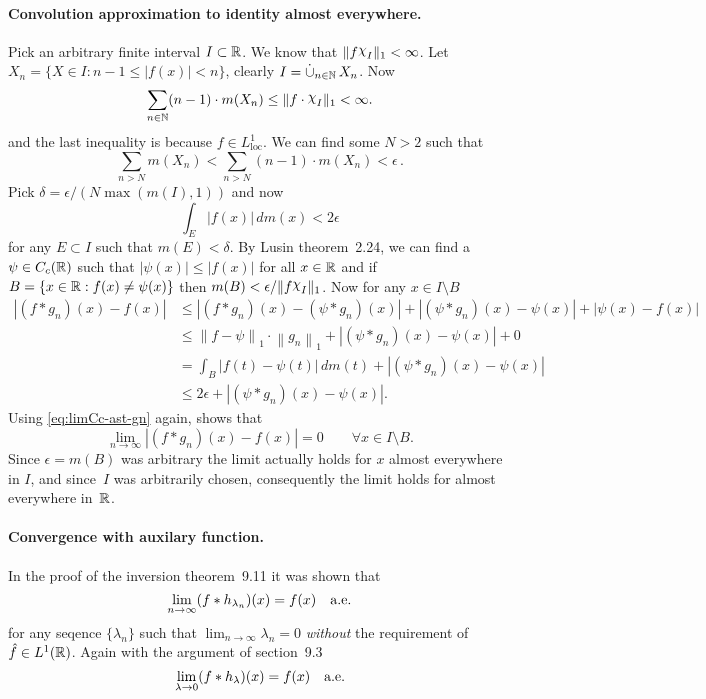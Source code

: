 \begin{enumerate}
\paragraph{Convolution approximation to identity almost everywhere.}
Pick an arbitrary finite interval \(I\subset \mathbb{R}\).
We know that \(\|f\chhi_I\|_1 < \infty\).
Let \(X_n = \{X\in I: n - 1 \leq |f(x)| < n\}\), 
clearly \(I=\disjunion_{n\in\N} X_n\).
Now
\begin{equation*}
\sum_{n\in\N} (n-1)\cdot m(X_n) 
 \leq \|f\cdot\chhi_I\|_1
 < \infty.
\end{equation*}
and the last inequality is because \(f\in L_{\textrm{loc}}^1\).
We can find some \(N>2\) such that  
\begin{equation*}
\sum_{n>N} m(X_n) < \sum_{n>N} (n-1)\cdot m(X_n) < \epsilon\,.
\end{equation*}
Pick \(\delta = \epsilon/(N \max(m(I),1))\) and now 
\begin{equation*}
\int_E |f(x)|\,dm(x) < 2\epsilon
\end{equation*}
for any \(E\subset I\) such that \(m(E) < \delta\).
By Lusin theorem~2.24, we can find a \(\psi\in C_c(\mathbb{R})\)
such that  \(|\psi(x)|\leq |f(x)|\) for all \(x\in\mathbb{R}\)
and if \(B = \{x\in\mathbb{R}: f(x)\neq \psi(x)\}\)
then \(m(B) < \epsilon / \|f\chhi_I\|_1\). Now for any \(x\in I \setminus B\)
\begin{align*}
|(f\ast g_n)(x) - f(x)|
&\leq  |(f \ast g_n)(x) - (\psi \ast g_n)(x)|
     + |(\psi \ast g_n)(x) - \psi(x)|
     + |\psi(x) - f(x)| \\
&\leq \left\|f-\psi\right\|_1 \cdot \left\|g_n\right\|_1 
      + |(\psi \ast g_n)(x) - \psi(x)|
      + 0 \\
&= \int_B|f(t) - \psi(t)|\,dm(t) + |(\psi \ast g_n)(x) - \psi(x)| \\
&\leq 2\epsilon + |(\psi \ast g_n)(x) - \psi(x)|.
\end{align*}
Using \eqref{eq:limCc-ast-gn} again, shows that 
\begin{equation*}
\lim_{n\to\infty}|(f\ast g_n)(x) - f(x)| = 0 \qquad \forall x\in I\setminus B.
\end{equation*}
Since \(\epsilon = m(B)\) was arbitrary the limit actually holds
for $x$ almost everywhere in $I$, and since~$I$ was arbitrarily
chosen, consequently the limit holds for almost everywhere in~\(\mathbb{R}\).

\paragraph{Convergence with auxilary function.}
In the proof of the inversion theorem~9.11 it was shown that 
\begin{equation*}
\lim_{n\to\infty}(f\ast h_{\lambda_n})(x) = f(x)\quad\textrm{a.e.}
\end{equation*}
for any seqence \(\{\lambda_n\}\) such that 
\(\lim_{n\to\infty} \lambda_n = 0\)
\emph{without} the requirement of \(\hat{f}\in L^1(\mathbb{R})\).
Again with the argument of section~9.3
\begin{equation*}
\lim_{\lambda\to 0}(f\ast h_\lambda)(x) = f(x)\quad\textrm{a.e.}
\end{equation*}


\end{enumerate}
